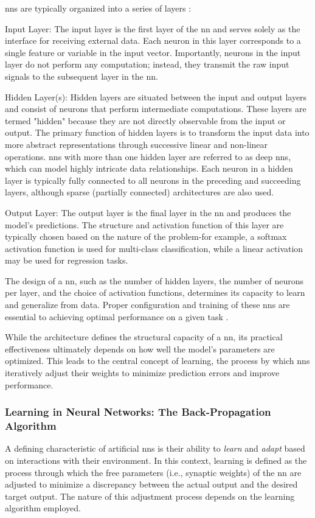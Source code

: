 \ac{nn}s are typically organized into a series of layers \parencite[p.~4]{mienye2024nncomprehensivereview}:

Input Layer: The input layer is the first layer of the \ac{nn} and serves solely as the interface for receiving external data. Each neuron in this layer corresponds to a single feature or variable in the input vector. Importantly, neurons in the input layer do not perform any computation; instead, they transmit the raw input signals to the subsequent layer in the \ac{nn}.

Hidden Layer(s): Hidden layers are situated between the input and output layers and consist of neurons that perform intermediate computations. These layers are termed "hidden" because they are not directly observable from the input or output. The primary function of hidden layers is to transform the input data into more abstract representations through successive linear and non-linear operations. \ac{nn}s with more than one hidden layer are referred to as deep \ac{nn}s, which can model highly intricate data relationships. Each neuron in a hidden layer is typically fully connected to all neurons in the preceding and succeeding layers, although sparse (partially connected) architectures are also used.

Output Layer: The output layer is the final layer in the \ac{nn} and produces the model's predictions. The structure and activation function of this layer are typically chosen based on the nature of the problem-for example, a softmax activation function is used for multi-class classification, while a linear activation may be used for regression tasks.

The design of a \ac{nn}, such as the number of hidden layers, the number of neurons per layer, and the choice of activation functions, determines its capacity to learn and generalize from data. Proper configuration and training of these \ac{nn}s are essential to achieving optimal performance on a given task \parencite{sazli2006feedforwardnn}.

While the architecture defines the structural capacity of a \ac{nn}, its practical effectiveness ultimately depends on how well the model's parameters are optimized. This leads to the central concept of learning, the process by which \ac{nn}s iteratively adjust their weights to minimize prediction errors and improve performance.

\subsubsection{Learning in Neural Networks: The Back-Propagation Algorithm}
A defining characteristic of artificial \ac{nn}s is their ability to \textit{learn} and \textit{adapt} based on interactions with their environment. In this context, learning is defined as the process through which the free parameters (i.e., synaptic weights) of the \ac{nn} are adjusted to minimize a discrepancy between the actual output and the desired target output. The nature of this adjustment process depends on the learning algorithm employed.


